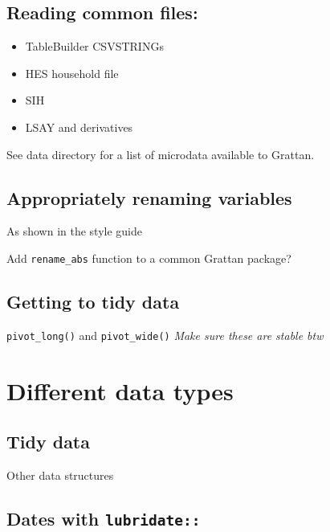 \documentclass[]{book}
\providecommand{\tightlist}{%
  \setlength{\itemsep}{0pt}\setlength{\parskip}{0pt}}
\begin{document}
\hypertarget{reading-common-files}{%
\section{Reading common files:}\label{reading-common-files}}

\begin{itemize}
\tightlist
\item
  TableBuilder CSVSTRINGs
\item
  HES household file
\item
  SIH
\item
  LSAY and derivatives
\end{itemize}

See data directory for a list of microdata available to Grattan.

\hypertarget{appropriately-renaming-variables}{%
\section{Appropriately renaming variables}\label{appropriately-renaming-variables}}

As shown in the style guide

Add \texttt{rename\_abs} function to a common Grattan package?

\hypertarget{getting-to-tidy-data}{%
\section{Getting to tidy data}\label{getting-to-tidy-data}}

\texttt{pivot\_long()} and \texttt{pivot\_wide()}
\emph{Make sure these are stable btw}

\hypertarget{different-data-types}{%
\chapter{Different data types}\label{different-data-types}}

\hypertarget{tidy-data}{%
\section{Tidy data}\label{tidy-data}}

Other data structures

\hypertarget{dates-with-lubridate}{%
\section{\texorpdfstring{Dates with \texttt{lubridate::}}{Dates with lubridate::}}\label{dates-with-lubridate}}
\end{document}
